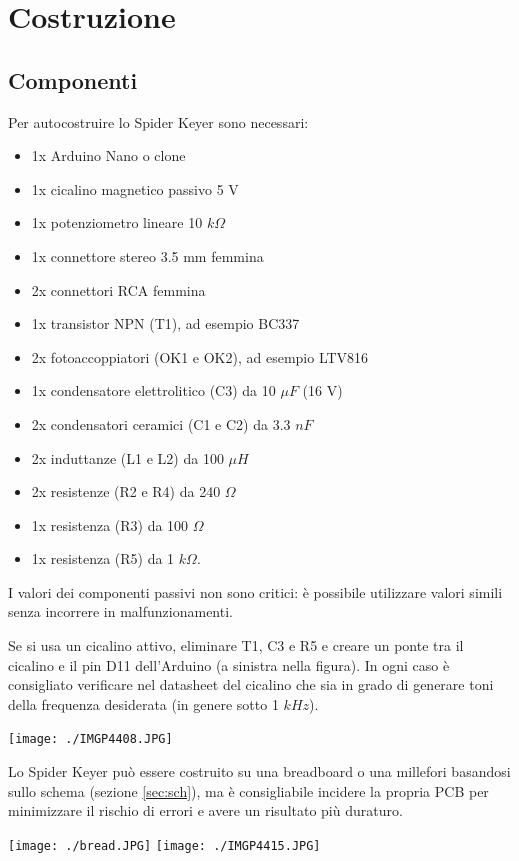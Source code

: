 \chapter{Costruzione}

\section{Componenti}
Per autocostruire lo Spider Keyer sono necessari:
\begin{itemize}
	\item 1x Arduino Nano o clone
	\item 1x cicalino magnetico passivo 5 V
	\item 1x potenziometro lineare 10 $k\Omega$
	\item 1x connettore stereo 3.5 mm femmina
	\item 2x connettori RCA femmina
	\item 1x transistor NPN (T1), ad esempio BC337
	\item 2x fotoaccoppiatori (OK1 e OK2), ad esempio LTV816
	\item 1x condensatore elettrolitico (C3) da 10 $\mu F$ (16 V)
	\item 2x condensatori ceramici (C1 e C2) da 3.3 $nF$
	\item 2x induttanze (L1 e L2) da 100 $\mu H$
	\item 2x resistenze (R2 e R4) da 240 $\Omega$
	\item 1x resistenza (R3) da 100 $\Omega$
	\item 1x resistenza (R5) da 1 $k\Omega$.
\end{itemize}

I valori dei componenti passivi non sono critici: \`e possibile utilizzare valori simili senza incorrere in malfunzionamenti.

\begin{samepage}
	Se si usa un cicalino attivo, eliminare T1, C3 e R5 e creare un ponte tra il cicalino e il pin D11 dell'Arduino (a sinistra nella figura). In ogni caso \`e consigliato verificare nel datasheet del cicalino che sia in grado di generare toni della frequenza desiderata (in genere sotto 1 $kHz$).
	\begin{center}
		\texttt{[image: ./IMGP4408.JPG]}
	\end{center}
\end{samepage}
\pagebreak
\begin{samepage}
	Lo Spider Keyer pu\`o essere costruito su una breadboard o una millefori basandosi sullo schema (sezione \ref{sec:sch}), ma \`e consigliabile incidere la propria PCB per minimizzare il rischio di errori e avere un risultato pi\`u duraturo.
	\begin{center}
		\texttt{[image: ./bread.JPG]}
		\texttt{[image: ./IMGP4415.JPG]}		
	\end{center}
	
\end{samepage}

